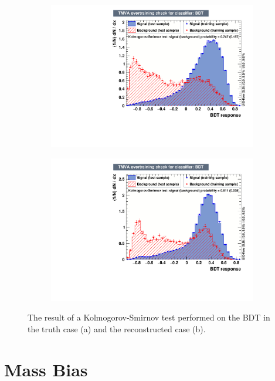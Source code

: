 \documentclass[10pt,a4paper]{book}
\begin{document}
\begin{figure}[h]
\begin{subfigure}{0.8\textwidth}
\centering
\includegraphics[width=\textwidth]{ch4_images/ks_bdt_truth}
\caption{}
\end{subfigure}
\begin{subfigure}{0.8\textwidth}
\centering
\includegraphics[width=\textwidth]{ch4_images/ks_bdt_reco}
\caption{}
\end{subfigure}
\caption{The result of a Kolmogorov-Smirnov test performed on the BDT in the truth case (a) and the reconstructed case (b).}
\label{kolmogorov smirnov bdt}
\end{figure} 


\section{Mass Bias}
\end{document}

